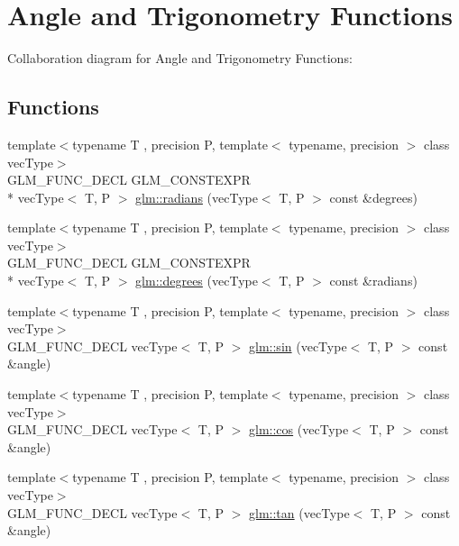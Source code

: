 \hypertarget{group__core__func__trigonometric}{\section{Angle and Trigonometry Functions}
\label{group__core__func__trigonometric}
}
Collaboration diagram for Angle and Trigonometry Functions\-:
\subsection*{Functions}
\begin{DoxyCompactItemize}
\item 
{\footnotesize template$<$typename T , precision P, template$<$ typename, precision $>$ class vec\-Type$>$ }\\G\-L\-M\-\_\-\-F\-U\-N\-C\-\_\-\-D\-E\-C\-L G\-L\-M\-\_\-\-C\-O\-N\-S\-T\-E\-X\-P\-R \\*
vec\-Type$<$ T, P $>$ \hyperlink{group__core__func__trigonometric_gafffb5e533f75318bdf4e0967d8a6c05c}{glm\-::radians} (vec\-Type$<$ T, P $>$ const \&degrees)
\item 
{\footnotesize template$<$typename T , precision P, template$<$ typename, precision $>$ class vec\-Type$>$ }\\G\-L\-M\-\_\-\-F\-U\-N\-C\-\_\-\-D\-E\-C\-L G\-L\-M\-\_\-\-C\-O\-N\-S\-T\-E\-X\-P\-R \\*
vec\-Type$<$ T, P $>$ \hyperlink{group__core__func__trigonometric_gabccdcc282134fd62af0ff3d6e4bb21f1}{glm\-::degrees} (vec\-Type$<$ T, P $>$ const \&radians)
\item 
{\footnotesize template$<$typename T , precision P, template$<$ typename, precision $>$ class vec\-Type$>$ }\\G\-L\-M\-\_\-\-F\-U\-N\-C\-\_\-\-D\-E\-C\-L vec\-Type$<$ T, P $>$ \hyperlink{group__core__func__trigonometric_ga4a0ddceb6b1e64ce0e4da209dcb021d5}{glm\-::sin} (vec\-Type$<$ T, P $>$ const \&angle)
\item 
{\footnotesize template$<$typename T , precision P, template$<$ typename, precision $>$ class vec\-Type$>$ }\\G\-L\-M\-\_\-\-F\-U\-N\-C\-\_\-\-D\-E\-C\-L vec\-Type$<$ T, P $>$ \hyperlink{group__core__func__trigonometric_ga728fd86f14609e37d83f82429995b7b3}{glm\-::cos} (vec\-Type$<$ T, P $>$ const \&angle)
\item 
{\footnotesize template$<$typename T , precision P, template$<$ typename, precision $>$ class vec\-Type$>$ }\\G\-L\-M\-\_\-\-F\-U\-N\-C\-\_\-\-D\-E\-C\-L vec\-Type$<$ T, P $>$ \hyperlink{group__core__func__trigonometric_gab3ae890c38b7d3aa4d5e00998fd296b2}{glm\-::tan} (vec\-Type$<$ T, P $>$ const \&angle)

\end{DoxyCompactItemize}
